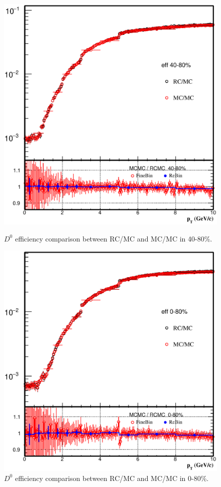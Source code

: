\begin{figure}[htbp]
\begin{minipage}[htbp]{0.52\linewidth}
\centering
\includegraphics[width=1.0\textwidth]{figure/Run14_D0HFT/D0_eff_forMCRC_40_80.eps}
\caption{$D^{0}$ efficiency comparison between RC/MC and MC/MC in 40-80\%. \label{fig:D0_eff_forMCRC_40_80}}
\end{minipage}
\hfill
\begin{minipage}[htbp]{0.52\linewidth}
\centering
\includegraphics[width=1.0\textwidth]{figure/Run14_D0HFT/D0_eff_forMCRC_0_80.eps} 
\caption{$D^{0}$ efficiency comparison between RC/MC and MC/MC in 0-80\%. \label{fig:D0_eff_forMCRC_0_80}}
\end{minipage}
\end{figure}

